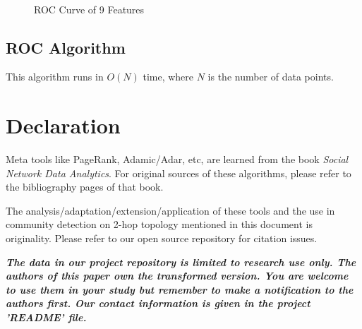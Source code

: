 \documentclass[11pt,a4paper]{article}
\begin{document}
\begin{figure}[htb]
\begin{center}
        \\%
%
    \end{center}
    \caption{%
        ROC Curve of 9 Features
     }%
     \label{fig:roc_sub_all}
\end{figure}


\subsection*{ROC Algorithm}

This algorithm runs in $O(N)$ time, where 
$N$ is the number of data points. 
 

\section*{Declaration}

Meta tools like PageRank, Adamic/Adar, etc, are learned from the book
\textit{Social Network Data Analytics}. For original sources of these 
algorithms, please refer to the bibliography pages of that book.

The analysis/adaptation/extension/application of these tools and 
the use in community detection on 2-hop topology mentioned 
in this document is originality. Please refer to our open source 
repository for citation issues.

\textbf{\textit{
The data in our project repository is limited to research use only. 
The authors of this paper own the transformed version. You are welcome
to use them in your study but remember to make a notification to the 
authors first. Our contact information is given in the project 'README' file. }}
\end{document}
